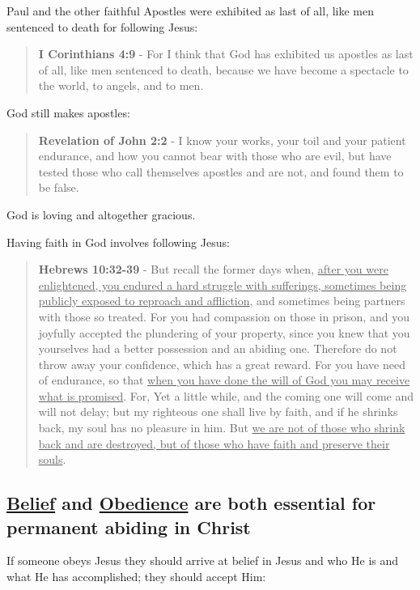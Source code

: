 \documentclass[11pt]{article}
\begin{document}
Paul and the other faithful Apostles were exhibited as last of all, like men sentenced to death for following Jesus:

\begin{quote}
\textbf{I Corinthians 4:9} - For I think that God has exhibited us apostles as last of all, like men sentenced to death, because we have become a spectacle to the world, to angels, and to men.
\end{quote}

God still makes apostles:

\begin{quote}
\textbf{Revelation of John 2:2} - I know your works, your toil and your patient endurance, and how you cannot bear with those who are evil, but have tested those who call themselves apostles and are not, and found them to be false.
\end{quote}

God is loving and altogether gracious.

Having faith in God involves following Jesus:

\begin{quote}
\textbf{Hebrews 10:32-39} - But recall the former days when, \uline{after you were enlightened, you endured a hard struggle with sufferings, sometimes being publicly exposed to reproach and affliction}, and sometimes being partners with those so treated. For you had compassion on those in prison, and you joyfully accepted the plundering of your property, since you knew that you yourselves had a better possession and an abiding one. Therefore do not throw away your confidence, which has a great reward. For you have need of endurance, so that \uline{when you have done the will of God you may receive what is promised}. For, Yet a little while, and the coming one will come and will not delay; but my righteous one shall live by faith, and if he shrinks back, my soul has no pleasure in him. But \uline{we are not of those who shrink back and are destroyed, but of those who have faith and preserve their souls}.
\end{quote}

\subsection{\underline{Belief} and \underline{Obedience} are both essential for permanent abiding in Christ}
\label{sec:org1e9093c}
If someone obeys Jesus they should arrive at belief in Jesus and who He is and what He has accomplished; they should accept Him:
\end{document}
